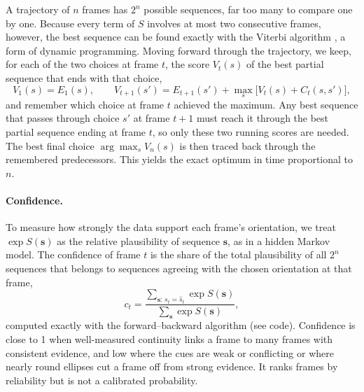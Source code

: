 A trajectory of $n$ frames has $2^n$ possible sequences, far too many to compare one by one. Because every term of
$S$ involves at most two consecutive frames, however, the best sequence can be found exactly with the Viterbi
algorithm \citep{viterbi1967}, a form of dynamic programming. Moving forward through the trajectory, we keep, for
each of the two choices at frame $t$, the score $V_t(s)$ of the best partial sequence that ends with that choice,
\begin{equation}
  V_1(s) = E_1(s), \qquad
  V_{t+1}(s') = E_{t+1}(s') + \max_{s} \big[ V_t(s) + C_t(s, s') \big],
\end{equation}
and remember which choice at frame $t$ achieved the maximum. Any best sequence that passes through choice $s'$ at
frame $t+1$ must reach it through the best partial sequence ending at frame $t$, so only these two running scores
are needed. The best final choice $\arg\max_s V_n(s)$ is then traced back through the remembered predecessors.
This yields the exact optimum in time proportional to $n$.

\paragraph{Confidence.}
To measure how strongly the data support each frame's orientation, we treat $\exp S(\mathbf{s})$ as the relative
plausibility of sequence $\mathbf{s}$, as in a hidden Markov model. The confidence of frame $t$ is the share of the
total plausibility of all $2^n$ sequences that belongs to sequences agreeing with the chosen orientation at that frame,
\begin{equation}
  c_t = \frac{\sum_{\mathbf{s}:\, s_t = \hat s_t} \exp S(\mathbf{s})}{\sum_{\mathbf{s}} \exp S(\mathbf{s})},
\end{equation}
computed exactly with the forward--backward algorithm (see code). Confidence is close to 1 when well-measured
continuity links a frame to many frames with consistent evidence, and low where the cues are weak or conflicting or
where nearly round ellipses cut a frame off from strong evidence. It ranks frames by reliability but is not a
calibrated probability.

